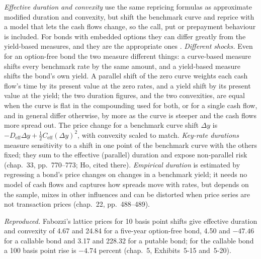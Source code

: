 \begin{qfmethod}\label{meth:curve-based-empirical-duration}
 \emph{Effective duration and convexity} use the same repricing formulas as approximate modified duration and convexity, but shift the benchmark curve and reprice with a model that lets the cash flows change, so the call, put or prepayment behaviour is included. For bonds with embedded options they can differ greatly from the yield-based measures, and they are the appropriate ones \citep[chap.~5, pp.~117--118 and~128--135]{s7-fabozzifixed}. \emph{Different shocks.} Even for an option-free bond the two measure different things: a curve-based measure shifts every benchmark rate by the same amount, and a yield-based measure shifts the bond's own yield. A parallel shift of the zero curve weights each cash flow's time by its present value at the zero rates, and a yield shift by its present value at the yield; the two duration figures, and the two convexities, are equal when the curve is flat in the compounding used for both, or for a single cash flow, and in general differ otherwise, by more as the curve is steeper and the cash flows more spread out. The price change for a benchmark curve shift $\Delta y$ is $-D_{\text{eff}}\Delta y+\tfrac12C_{\text{eff}}(\Delta y)^2$, with convexity scaled to match. \emph{Key-rate durations} measure sensitivity to a shift in one point of the benchmark curve with the others fixed; they sum to the effective (parallel) duration and expose non-parallel risk (chap.~33, pp.~770--773; Ho, cited there). \emph{Empirical duration} is estimated by regressing a bond's price changes on changes in a benchmark yield; it needs no model of cash flows and captures how spreads move with rates, but depends on the sample, mixes in other influences and can be distorted when price series are not transaction prices (chap.~22, pp.~488--489).

 \emph{Reproduced.} Fabozzi's lattice prices for 10 basis point shifts give effective duration and convexity of 4.67 and 24.84 for a five-year option-free bond, 4.50 and $-47.46$ for a callable bond and 3.17 and 228.32 for a putable bond; for the callable bond a 100 basis point rise is $-4.74$ percent (chap.~5, Exhibits~5-15 and~5-20).


\end{qfmethod}
